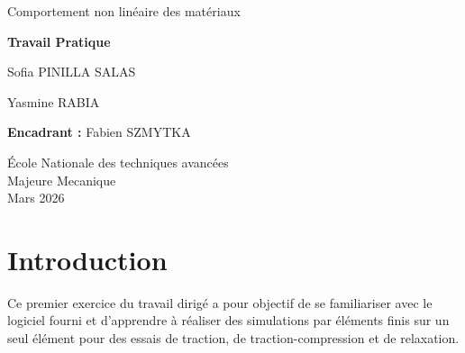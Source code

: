 \documentclass[11pt,a4paper]{article}
\begin{document}
\begin{titlepage}
    \centering
    \vspace*{4cm}
    
    \par\vspace{0.5cm}
    
    \vspace{0.5cm}
    {\Large Comportement non linéaire des matériaux \par}
    \vspace{0.2cm}
    {\huge\bfseries Travail Pratique \par}
    \vspace{3cm}
    {\Large Sofia PINILLA SALAS \par}
    {\Large Yasmine RABIA \par}
    {\Large  \par}
    \vspace{1.5cm}
    \textbf{Encadrant :} Fabien SZMYTKA \par
    \vfill
    École Nationale des techniques avancées\\
    Majeure Mecanique\\
    Mars 2026 \par
\end{titlepage}

\newpage
\tableofcontents
\newpage

\section{Introduction}

Ce premier exercice du travail dirigé a pour objectif de se familiariser avec le logiciel fourni et d’apprendre à réaliser des simulations par éléments finis sur un seul élément pour des essais de traction, de traction-compression et de relaxation. 
\end{document}
